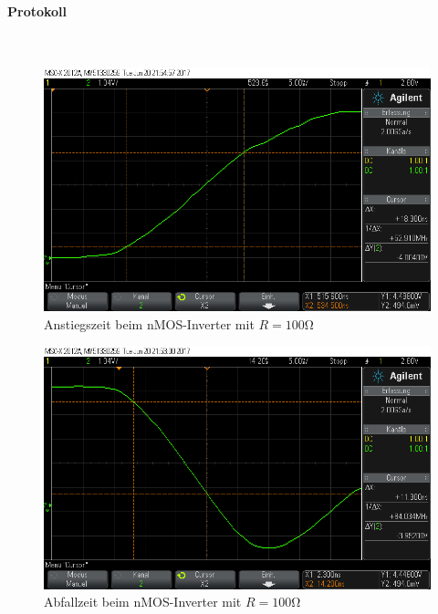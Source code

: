 \documentclass[10pt]{scrreprt}
\begin{document}
    \paragraph{Protokoll}
    $ $
    \begin{figure}[H]
        \includegraphics[width=\textwidth]{scope_4.png}
        \caption{Anstiegszeit beim nMOS-Inverter mit $R = 100\si{\ohm}$}
    \end{figure}
    \begin{figure}[H]
        \includegraphics[width=\textwidth]{scope_3.png}
        \caption{Abfallzeit beim nMOS-Inverter mit $R = 100\si{\ohm}$}
    \end{figure}
\end{document}

